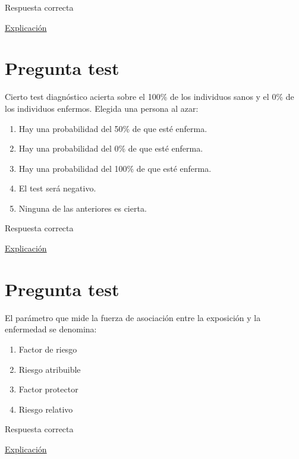 \documentclass[
]{book}
\providecommand{\tightlist}{%
  \setlength{\itemsep}{0pt}\setlength{\parskip}{0pt}}
\begin{document}
Respuesta correcta

\href{https://1fjmanzano.github.io/bioestadistica/relaci\%C3\%B3n-entre-variables-cualitativas.html\#diagno\%CC\%81stico-cli\%CC\%81nico}{Explicación}

\hypertarget{pregunta-test-161}{%
\section{Pregunta test}\label{pregunta-test-161}}

Cierto test diagnóstico acierta sobre el 100\% de los individuos sanos y el 0\% de los individuos enfermos. Elegida una persona al azar:

\begin{enumerate}
\def\labelenumi{\alph{enumi})}
\tightlist
\item
  Hay una probabilidad del 50\% de que esté enferma.
\item
  Hay una probabilidad del 0\% de que esté enferma.
\item
  Hay una probabilidad del 100\% de que esté enferma.
\item
  El test será negativo.
\item
  Ninguna de las anteriores es cierta.
\end{enumerate}

Respuesta correcta

\href{https://1fjmanzano.github.io/bioestadistica/relaci\%C3\%B3n-entre-variables-cualitativas.html\#diagno\%CC\%81stico-cli\%CC\%81nico}{Explicación}

\hypertarget{pregunta-test-162}{%
\section{Pregunta test}\label{pregunta-test-162}}

El parámetro que mide la fuerza de asociación entre la exposición y la enfermedad se denomina:

\begin{enumerate}
\def\labelenumi{\alph{enumi})}
\tightlist
\item
  Factor de riesgo
\item
  Riesgo atribuible
\item
  Factor protector
\item
  Riesgo relativo
\end{enumerate}

Respuesta correcta

\href{https://es.wikipedia.org/wiki/Riesgo_relativo}{Explicación}
\end{document}
